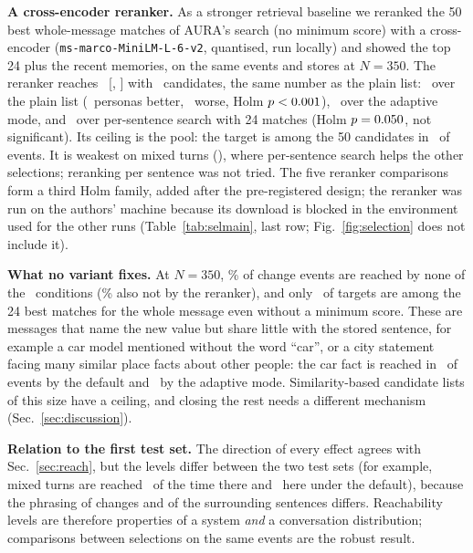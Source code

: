 \IfFileExists{IEEEtran.cls}{\documentclass[journal]{IEEEtran}\def\HAVEIEEE{1}}{\documentclass[10pt,twocolumn]{article}\usepackage[margin=0.7in,columnsep=0.25in]{geometry}}
\newcommand{\aura}{AURA}
\begin{document}
\textbf{A cross-encoder reranker.} As a stronger retrieval baseline we reranked the 50 best whole-message matches of \aura's search (no minimum score) with a cross-encoder (\texttt{ms-marco-MiniLM-L-6-v2}, quantised, run locally) and showed the top 24 plus the recent memories, on the same events and stores at $N=350$. The reranker reaches \selRerank\ [\selRerankLo, \selRerankHi] with \selRerankCand\ candidates, the same number as the plain list: \selRNk\ over the plain list (\selRNkPos\ personas better, \selRNkNeg\ worse, Holm $p<0.001$), \selRAda\ over the adaptive mode, and \selRSnk\ over per-sentence search with 24 matches (Holm $p=0.050$, not significant). Its ceiling is the pool: the target is among the 50 candidates in \selRerankPool\ of events. It is weakest on mixed turns (\selRerankMixed), where per-sentence search helps the other selections; reranking per sentence was not tried. The five reranker comparisons form a third Holm family, added after the pre-registered design; the reranker was run on the authors' machine because its download is blocked in the environment used for the other runs (Table~\ref{tab:selmain}, last row; Fig.~\ref{fig:selection} does not include it).

\textbf{What no variant fixes.} At $N=350$, \selMissedAllPct\% of change events are reached by none of the \selNConditions\ conditions (\selMissedAllRerankPct\% also not by the reranker), and only \selRtwentyfour\ of targets are among the 24 best matches for the whole message even without a minimum score. These are messages that name the new value but share little with the stored sentence, for example a car model mentioned without the word ``car'', or a city statement facing many similar place facts about other people: the car fact is reached in \selCarDefault\ of events by the default and \selCarAdaptive\ by the adaptive mode. Similarity-based candidate lists of this size have a ceiling, and closing the rest needs a different mechanism (Sec.~\ref{sec:discussion}).

\textbf{Relation to the first test set.} The direction of every effect agrees with Sec.~\ref{sec:reach}, but the levels differ between the two test sets (for example, mixed turns are reached \mixedDefault\ of the time there and \selDefaultMixed\ here under the default), because the phrasing of changes and of the surrounding sentences differs. Reachability levels are therefore properties of a system \emph{and} a conversation distribution; comparisons between selections on the same events are the robust result.
\end{document}
